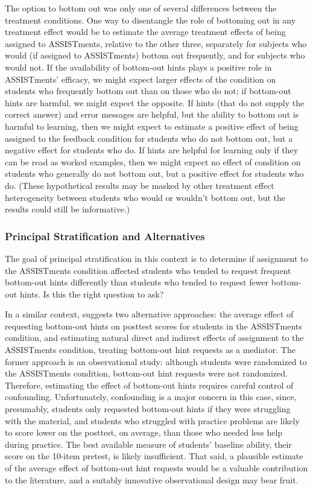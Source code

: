 \documentclass[]{article}
\begin{document}
The option to bottom out was only one of several differences between the treatment conditions. One way to disentangle the role of bottoming out in any treatment effect would be to estimate the average treatment effects of being assigned to ASSISTments, relative to the other three, separately for subjects who would (if assigned to ASSISTments) bottom out frequently, and for subjects who would not.
If the availability of bottom-out hints plays a positive role in ASSISTments' efficacy, we might expect larger effects of the condition on students who frequently bottom out than on those who do not; if bottom-out hints are harmful, we might expect the opposite.
If hints (that do not supply the correct answer) and error messages are helpful, but the ability to bottom out is harmful to learning, then we might expect to estimate a positive effect of being assigned to the feedback condition for students who do not bottom out, but a negative effect for students who do. If hints are helpful for learning only if they can be read as worked examples, then we might expect no effect of condition on students who generally do not bottom out, but a positive effect for students who do.
(These hypothetical results may be masked by other treatment effect heterogeneity between students who would or wouldn't bottom out, but the results could still be informative.)

\subsubsection{Principal Stratification and Alternatives}\label{sec:psInEdTech}
The goal of principal stratification in this context is to determine if assignment to the ASSISTments condition affected students who tended to request frequent bottom-out hints differently than students who tended to request fewer bottom-out hints.
Is this the right question to ask?

In a similar context, \citet{sales2021student} suggests two alternative approaches: the average effect of requesting bottom-out hints on posttest scores for students in the ASSISTments condition, and estimating natural direct and indirect effects of assignment to the ASSISTments condition, treating bottom-out hint requests as a mediator.
The former approach is an observational study: although students were randomized to the ASSISTments condition, bottom-out hint requests were not randomized. Therefore, estimating the effect of bottom-out hints requires careful control of confounding.
Unfortunately, confounding is a major concern in this case, since, presumably, students only requested bottom-out hints if they were struggling with the material, and students who struggled with practice problems are likely to score lower on the posttest, on average, than those who needed less help during practice.
The best available measure of students' baseline ability, their score on the 10-item pretest, is likely insufficient.
That said, a plausible estimate of the average effect of bottom-out hint requests would be a valuable contribution to the literature, and a suitably innovative observational design \citep[e.g.][]{beck} may bear fruit.
\end{document}
